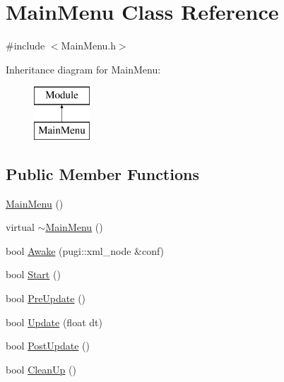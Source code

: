 \hypertarget{class_main_menu}{}\section{Main\+Menu Class Reference}
\label{class_main_menu}


{\ttfamily \#include $<$Main\+Menu.\+h$>$}

Inheritance diagram for Main\+Menu\+:\begin{figure}[H]
\begin{center}
\leavevmode
\includegraphics[height=2.000000cm]{class_main_menu}
\end{center}
\end{figure}
\subsection*{Public Member Functions}
\begin{DoxyCompactItemize}
\item 
\mbox{\hyperlink{class_main_menu_a53eecf9d5ffd094f54ac4193e7e57eaf}{Main\+Menu}} ()
\item 
virtual \mbox{\hyperlink{class_main_menu_a0a19ddba3ac52bf39c09b579171c98f2}{$\sim$\+Main\+Menu}} ()
\item 
bool \mbox{\hyperlink{class_main_menu_a0b45e9eb6945b2d26f54d708c24fb924}{Awake}} (pugi\+::xml\+\_\+node \&conf)
\item 
bool \mbox{\hyperlink{class_main_menu_a02d38874242aae89ce95925b5fad05f4}{Start}} ()
\item 
bool \mbox{\hyperlink{class_main_menu_aba12dda658020b2394ec3449c92ae16e}{Pre\+Update}} ()
\item 
bool \mbox{\hyperlink{class_main_menu_a0c2e38b67627d0ac2315c82ae46cd8ef}{Update}} (float dt)
\item 
bool \mbox{\hyperlink{class_main_menu_a39f02a2a3397937781de079abba13a5a}{Post\+Update}} ()
\item 
bool \mbox{\hyperlink{class_main_menu_a87852de56aa660cfd0c2f578f9114773}{Clean\+Up}} ()
\end{DoxyCompactItemize}
